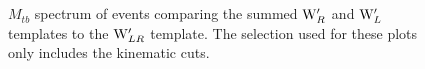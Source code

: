 \begin{figure}[htcb]
\begin{center}
\\
\\
\caption{
$M_{tb}$ spectrum of events comparing the summed $\mathrm{W}^\prime_{R}$ and $\mathrm{W}^\prime_{L}$ templates to the $\mathrm{W}^\prime_{LR}$ template.  The selection used for these plots only includes the kinematic cuts.
}
\label{figs:Gencomp1}
\end{center}
\end{figure}

